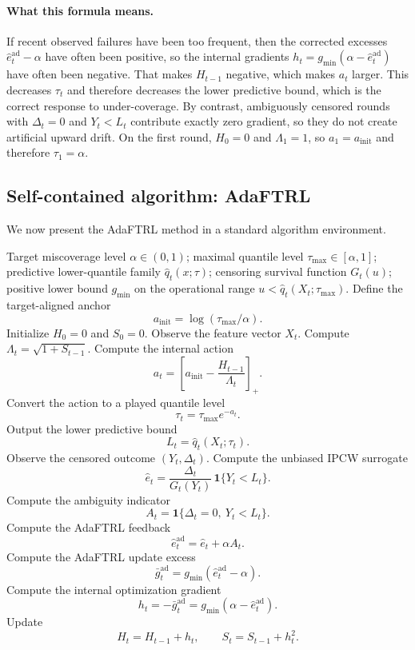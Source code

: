 \documentclass[11pt]{article}
\newcommand{\1}{\mathbf{1}}
\begin{document}
\paragraph{What this formula means.}
If recent observed failures have been too frequent, then the corrected excesses \(\hat e_t^{\mathrm{ad}}-\alpha\) have often been positive, so the internal gradients \(h_t=g_{\min}(\alpha-\hat e_t^{\mathrm{ad}})\) have often been negative. That makes \(H_{t-1}\) negative, which makes \(a_t\) larger. This decreases \(\tau_t\) and therefore decreases the lower predictive bound, which is the correct response to under-coverage. By contrast, ambiguously censored rounds with \(\Delta_t=0\) and \(Y_t<L_t\) contribute exactly zero gradient, so they do not create artificial upward drift. On the first round, \(H_0=0\) and \(\Lambda_1=1\), so \(a_1=a_{\mathrm{init}}\) and therefore \(\tau_1=\alpha\).



\subsection{Self-contained algorithm: AdaFTRL}

We now present the AdaFTRL method in a standard algorithm environment.

\begin{algorithm}[ht]
\caption{Survival AdaFTRL}
\begin{algorithmic}[1]
\Require Target miscoverage level $\alpha\in(0,1)$; maximal quantile level $\tau_{\max}\in[\alpha,1]$; predictive lower-quantile family $\hat q_t(x;\tau)$; censoring survival function $G_t(u)$; positive lower bound $g_{\min}$ on the operational range $u<\hat q_t(X_t;\tau_{\max})$.
\State Define the target-aligned anchor
\[
a_{\mathrm{init}}=\log(\tau_{\max}/\alpha).
\]
\State Initialize $H_0=0$ and $S_0=0$.
  \State Observe the feature vector $X_t$.
  \State Compute $\Lambda_t=\sqrt{1+S_{t-1}}$.
  \State Compute the internal action
  \[
  a_t=\left[a_{\mathrm{init}}-\frac{H_{t-1}}{\Lambda_t}\right]_+.
  \]
  \State Convert the action to a played quantile level
  \[
  \tau_t=\tau_{\max}e^{-a_t}.
  \]
  \State Output the lower predictive bound
  \[
  L_t=\hat q_t(X_t;\tau_t).
  \]
  \State Observe the censored outcome $(Y_t,\Delta_t)$.
  \State Compute the unbiased IPCW surrogate
  \[
  \hat e_t=\frac{\Delta_t}{G_t(Y_t)}\,\1\{Y_t< L_t\}.
  \]
  \State Compute the ambiguity indicator
  \[
  A_t=\1\{\Delta_t=0,\ Y_t<L_t\}.
  \]
  \State Compute the AdaFTRL feedback
  \[
  \hat e_t^{\mathrm{ad}}=\hat e_t+\alpha A_t.
  \]
  \State Compute the AdaFTRL update excess
  \[
  \bar g_t^{\mathrm{ad}}=g_{\min}(\hat e_t^{\mathrm{ad}}-\alpha).
  \]
  \State Compute the internal optimization gradient
  \[
  h_t=-\bar g_t^{\mathrm{ad}}=g_{\min}(\alpha-\hat e_t^{\mathrm{ad}}).
  \]
  \State Update
  \[
  H_t=H_{t-1}+h_t,
  \qquad
  S_t=S_{t-1}+h_t^2.
  \]
\EndFor
\end{algorithmic}
\end{algorithm}
\end{document}
